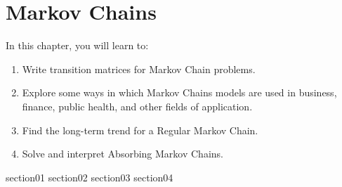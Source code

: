 \chapter{Markov Chains}

In this chapter, you will learn to:
\begin{enumerate}
    \item Write transition matrices for Markov Chain problems.
    \item Explore some ways in which Markov Chains models are used in business, finance, public health, and other fields of application.
    \item Find the long-term trend for a Regular Markov Chain.
    \item Solve and interpret Absorbing Markov Chains.
\end{enumerate}

{section01}
{section02}
{section03}
{section04}
